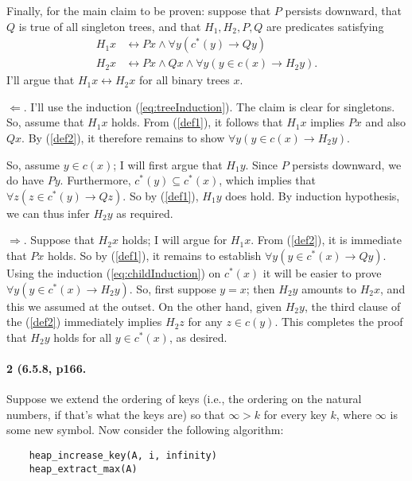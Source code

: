 \documentclass[
]{article}
\begin{document}
Finally, for the main claim to be proven: suppose that $P$ persists downward, that $Q$ is true of all singleton trees, and that $H_1, H_2, P, Q$ are predicates satisfying
\begin{align}
  \label{def1}
  H_1x
  &\leftrightarrow
    Px\land \forall y(c^*(y)\to Qy)\\
  \label{def2}
  H_2x
  &\leftrightarrow
    Px\land Qx \land \forall y(y\in c(x)\to H_2y).
\end{align}
I'll argue that $H_1x\leftrightarrow H_2x$ for all binary trees $x$.

$\Leftarrow$.  I'll use the induction (\ref{eq:treeInduction}).  The claim is clear for singletons.  So, assume that $H_1x$ holds.  From (\ref{def1}), it follows that $H_1x$ implies $Px$ and also $Qx$.  By (\ref{def2}), it therefore remains to show $\forall y(y\in c(x)\to H_2y)$.

So, assume $y\in c(x)$; I will first argue that $H_1y$.  Since $P$ persists downward, we do have $Py$.  Furthermore, $c^*(y)\subseteq c^*(x)$, which implies that $\forall z(z\in c^*(y)\to Qz)$.  So by (\ref{def1}), $H_1y$ does hold.  By induction hypothesis, we can thus infer $H_2y$ as required.

$\Rightarrow$.  Suppose that $H_2x$ holds;  I will argue for $H_1x$.  From (\ref{def2}), it is immediate that $Px$ holds.  So by (\ref{def1}), it remains to establish $\forall y(y\in c^*(x)\to Qy)$.  Using the induction (\ref{eq:childInduction}) on $c^*(x)$ it will be easier to prove $\forall y(y\in c^*(x)\to H_2y)$.  So, first suppose $y=x$; then $H_2y$ amounts to $H_2x$, and this we assumed at the outset. On the other hand, given $H_2y$, the third clause of the (\ref{def2}) immediately implies $H_2z$ for any $z\in c(y)$.  This completes the proof that $H_2y$ holds for all $y\in c^*(x)$, as desired.


\paragraph{2 (6.5.8, p166.}  Suppose we extend the ordering of keys (i.e., the ordering on the natural numbers, if that's what the keys are) so that $\infty>k$ for every key $k$, where $\infty$ is some new symbol.  Now consider the following algorithm:
\begin{verbatim}
    heap_increase_key(A, i, infinity)
    heap_extract_max(A)
\end{verbatim}
\end{document}
